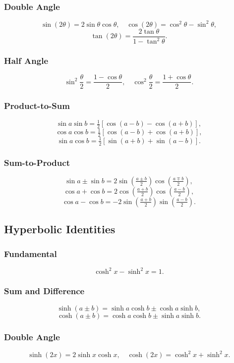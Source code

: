 \documentclass[a4paper,12pt]{article}
\begin{document}
\subsubsection{Double Angle}
\[
\sin(2\theta) = 2\sin\theta \cos\theta, \quad
\cos(2\theta) = \cos^2\theta - \sin^2\theta,
\]
\[
\tan(2\theta) = \frac{2\tan\theta}{1 - \tan^2\theta}.
\]

\subsubsection{Half Angle}
\[
\sin^2\frac{\theta}{2} = \frac{1-\cos\theta}{2}, \quad
\cos^2\frac{\theta}{2} = \frac{1+\cos\theta}{2}.
\]

\subsubsection{Product-to-Sum}
\[
\sin a \sin b = \tfrac{1}{2}[\cos(a-b) - \cos(a+b)],
\]
\[
\cos a \cos b = \tfrac{1}{2}[\cos(a-b) + \cos(a+b)],
\]
\[
\sin a \cos b = \tfrac{1}{2}[\sin(a+b) + \sin(a-b)].
\]

\subsubsection{Sum-to-Product}
\[
\sin a \pm \sin b = 2 \sin\left(\tfrac{a \pm b}{2}\right)\cos\left(\tfrac{a \mp b}{2}\right),
\]
\[
\cos a + \cos b = 2 \cos\left(\tfrac{a+b}{2}\right)\cos\left(\tfrac{a-b}{2}\right),
\]
\[
\cos a - \cos b = -2 \sin\left(\tfrac{a+b}{2}\right)\sin\left(\tfrac{a-b}{2}\right).
\]


\subsection{Hyperbolic Identities}

\subsubsection{Fundamental}
\[
\cosh^2 x - \sinh^2 x = 1.
\]

\subsubsection{Sum and Difference}
\[
\sinh(a \pm b) = \sinh a \cosh b \pm \cosh a \sinh b,
\]
\[
\cosh(a \pm b) = \cosh a \cosh b \pm \sinh a \sinh b.
\]

\subsubsection{Double Angle}
\[
\sinh(2x) = 2\sinh x \cosh x, \quad
\cosh(2x) = \cosh^2 x + \sinh^2 x.
\]
\end{document}
